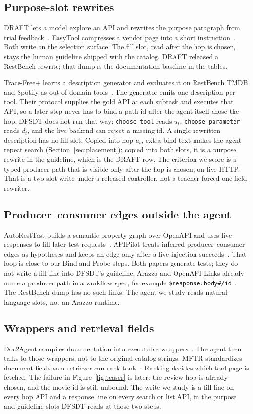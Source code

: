 \documentclass[11pt,a4paper]{article}
\begin{document}
\subsection*{Purpose-slot rewrites}
DRAFT lets a model explore an API and rewrites the purpose paragraph from trial feedback~\cite{qu2025draft}. EasyTool compresses a vendor page into a short instruction~\cite{yuan2025easytool}. Both write on the selection surface. The fill slot, read after the hop is chosen, stays the human guideline shipped with the catalog. DRAFT released a RestBench rewrite; that dump is the documentation baseline in the tables.

Trace-Free+ learns a description generator and evaluates it on RestBench TMDB and Spotify as out-of-domain tools~\cite{guo2026tracefree}. The generator emits one description per tool. Their protocol supplies the gold API at each subtask and executes that API, so a later step never has to bind a path id after the agent itself chose the hop. DFSDT does not run that way: \texttt{choose\_tool} reads $u_t$, \texttt{choose\_parameter} reads $d_t$, and the live backend can reject a missing id. A single rewritten description has no fill slot. Copied into hop $u_t$, extra bind text makes the agent repeat search (Section~\ref{sec:placement}); copied into both slots, it is a purpose rewrite in the guideline, which is the DRAFT row. The criterion we score is a typed producer path that is visible only after the hop is chosen, on live HTTP. That is a two-slot write under a released controller, not a teacher-forced one-field rewriter.

\subsection*{Producer--consumer edges outside the agent}
AutoRestTest builds a semantic property graph over OpenAPI and uses live responses to fill later test requests~\cite{kim2025autoresttest}. APIPilot treats inferred producer--consumer edges as hypotheses and keeps an edge only after a live injection succeeds~\cite{nguyen2026apipilot}. That loop is close to our Bind and Probe steps. Both papers generate tests; they do not write a fill line into DFSDT's guideline. Arazzo and OpenAPI Links already name a producer path in a workflow spec, for example \texttt{\$response.body\#/id}~\cite{arazzo2024}. The RestBench dump has no such links. The agent we study reads natural-language slots, not an Arazzo runtime.

\subsection*{Wrappers and retrieval fields}
Doc2Agent compiles documentation into executable wrappers~\cite{ni2025doc2agent}. The agent then talks to those wrappers, not to the original catalog strings. MFTR standardizes document fields so a retriever can rank tools~\cite{tang2026mftr}. Ranking decides which tool page is fetched. The failure in Figure~\ref{fig:teaser} is later: the review hop is already chosen, and the movie id is still unbound. The write we study is a fill line on every hop API and a response line on every search or list API, in the purpose and guideline slots DFSDT reads at those two steps.
\end{document}

